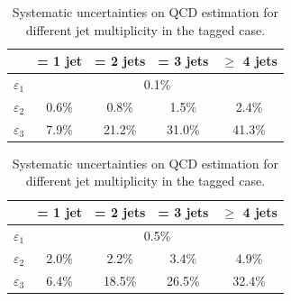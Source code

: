 \begin{table}[h!tb]\centering
\begin{tabular}{l c c c c}
\toprule
 & = 1 jet & = 2 jets & = 3 jets & $\ge$ 4 jets \\
\midrule
$\varepsilon_1 $ & \multicolumn{4}{c}{ 0.1\% } \\
$\varepsilon_2 $ &  0.6\% & 0.8\% & 1.5\% & 2.4\% \\
$\varepsilon_3 $ & 7.9\% &  21.2\% &   31.0\% &   41.3\% \\\bottomrule
\end{tabular}\caption{Systematic uncertainties on QCD estimation for different jet multiplicity in the untagged case.}\label{tab:systuncertuntag}
\begin{tabular}{l c c c c}
\toprule
 & = 1 jet & = 2 jets & = 3 jets & $\ge$ 4 jets \\
\midrule
$\varepsilon_1 $ & \multicolumn{4}{c}{ 0.5\% } \\
$\varepsilon_2 $ &  2.0\% & 2.2\% & 3.4\% & 4.9\% \\
$\varepsilon_3 $ & 6.4\% &  18.5\% &   26.5\% &   32.4\% \\\bottomrule
\end{tabular}\caption{Systematic uncertainties on QCD estimation for different jet multiplicity in the tagged case.}\label{tab:systuncerttag}
\end{table} 






